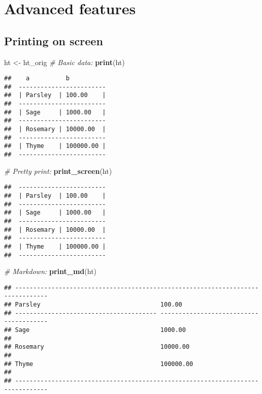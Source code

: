 \documentclass[]{article}
\newenvironment{Shaded}{\begin{snugshade}}{\end{snugshade}}
\newcommand{\KeywordTok}[1]{\textcolor[rgb]{0.13,0.29,0.53}{\textbf{{#1}}}}
\newcommand{\StringTok}[1]{\textcolor[rgb]{0.31,0.60,0.02}{{#1}}}
\newcommand{\CommentTok}[1]{\textcolor[rgb]{0.56,0.35,0.01}{\textit{{#1}}}}
\newcommand{\NormalTok}[1]{{#1}}
\begin{document}
\FloatBarrier

\section{Advanced features}\label{advanced-features}

\subsection{Printing on screen}\label{printing-on-screen}

\begin{Shaded}
\begin{Highlighting}[]
\NormalTok{ht <-}\StringTok{ }\NormalTok{ht_orig}
\CommentTok{# Basic data:}
\KeywordTok{print}\NormalTok{(ht)}
\end{Highlighting}
\end{Shaded}

\begin{verbatim}
##    a          b           
##  ------------------------ 
##  | Parsley  | 100.00    | 
##  ------------------------ 
##  | Sage     | 1000.00   | 
##  ------------------------ 
##  | Rosemary | 10000.00  | 
##  ------------------------ 
##  | Thyme    | 100000.00 | 
##  ------------------------
\end{verbatim}

\begin{Shaded}
\begin{Highlighting}[]
\CommentTok{# Pretty print:}
\KeywordTok{print_screen}\NormalTok{(ht)}
\end{Highlighting}
\end{Shaded}

\begin{verbatim}
##  ------------------------ 
##  | Parsley  | 100.00    | 
##  ------------------------ 
##  | Sage     | 1000.00   | 
##  ------------------------ 
##  | Rosemary | 10000.00  | 
##  ------------------------ 
##  | Thyme    | 100000.00 | 
##  ------------------------
\end{verbatim}

\begin{Shaded}
\begin{Highlighting}[]
\CommentTok{# Markdown:}
\KeywordTok{print_md}\NormalTok{(ht)}
\end{Highlighting}
\end{Shaded}

\begin{verbatim}
## -------------------------------------------------------------------------------
## Parsley                                 100.00                                  
## --------------------------------------- ---------------------------------------
## Sage                                    1000.00                                 
## 
## Rosemary                                10000.00                                
## 
## Thyme                                   100000.00                               
## 
## -------------------------------------------------------------------------------
\end{verbatim}
\end{document}
